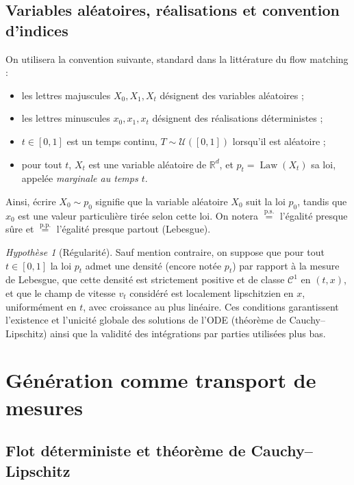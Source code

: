 \documentclass[11pt,a4paper]{article}
\theoremstyle{definition}
\theoremstyle{plain}
\theoremstyle{remark}
\newtheorem{hypothese}{Hypothèse}[section]
\newcommand{\R}{\mathbb{R}}
\DeclareMathOperator{\Law}{Law}
\begin{document}
\subsection{Variables aléatoires, réalisations et convention d'indices}

On utilisera la convention suivante, standard dans la littérature du flow
matching :
\begin{itemize}[leftmargin=*]
  \item les lettres majuscules $X_0,X_1,X_t$ désignent des variables aléatoires ;
  \item les lettres minuscules $x_0,x_1,x_t$ désignent des réalisations
  déterministes ;
  \item $t\in[0,1]$ est un temps continu, $T\sim\mathcal{U}([0,1])$ lorsqu'il est
  aléatoire ;
  \item pour tout $t$, $X_t$ est une variable aléatoire de $\R^d$, et $p_t=\Law(X_t)$
  sa loi, appelée \emph{marginale au temps $t$}.
\end{itemize}

Ainsi, écrire $X_0\sim p_0$ signifie que la variable aléatoire $X_0$ suit la loi
$p_0$, tandis que $x_0$ est une valeur particulière tirée selon cette loi. On
notera $\overset{\text{p.s.}}{=}$ l'égalité presque sûre et $\overset{\text{p.p.}}{=}$
l'égalité presque partout (Lebesgue).

\begin{hypothese}[Régularité]\label{hyp:regularite}
Sauf mention contraire, on suppose que pour tout $t\in[0,1]$ la loi $p_t$ admet
une densité (encore notée $p_t$) par rapport à la mesure de Lebesgue, que cette
densité est strictement positive et de classe $\mathcal{C}^1$ en $(t,x)$, et que
le champ de vitesse $v_t$ considéré est localement lipschitzien en $x$,
uniformément en $t$, avec croissance au plus linéaire. Ces conditions garantissent
l'existence et l'unicité globale des solutions de l'ODE (théorème de
Cauchy--Lipschitz) ainsi que la validité des intégrations par parties utilisées
plus bas.
\end{hypothese}

\section{Génération comme transport de mesures}

\subsection{Flot déterministe et théorème de Cauchy--Lipschitz}
\end{document}
